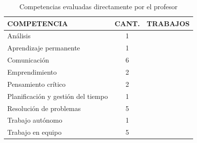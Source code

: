 \begin{table}
  \begin{center}
  \begin{tabular}{| m{6cm} | c | m{5cm} |}
    \hline
    COMPETENCIA & CANT. & TRABAJOS\\
    \hline
    \hline
    Análisis & 1 & \cite{aziz2007appraisal} \\
    \hline
    Aprendizaje permanente & 1 & \cite{rashid2008engineering} \\
    \hline
    Comunicación & 6 &  \cite{lacuesta2009active,martin2013acquired,rodriguez2010portfolio,benlloch2007adapting,yang2014fine,rashid2008engineering} \\
    \hline
    Emprendimiento & 2 & \cite{ward2011developing,rashid2008engineering} \\
    \hline
    Pensamiento crítico & 2 & \cite{lacuesta2009active,aziz2007appraisal} \\
    \hline
    Planificación y gestión del tiempo & 1 & \cite{lacuesta2009active} \\
    \hline
    Resolución de problemas & 5 & \cite{martin2013acquired,rodriguez2010portfolio,benlloch2007adapting,vizcarro2013assessment,aziz2007appraisal} \\
    \hline
    Trabajo autónomo & 1 &  \cite{lasa2013problem} \\
    \hline
    Trabajo en equipo & 5 &  \cite{lacuesta2009active,martin2013acquired,rodriguez2010portfolio,benlloch2007adapting,rashid2008engineering} \\
    \hline
  \end{tabular}
\end{center}
\caption{Competencias evaluadas directamente por el profesor}
\label{tab:CompetenciasProfesor}
\end{table}
 



